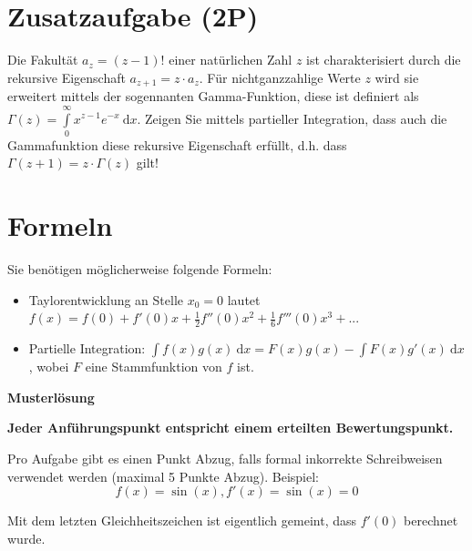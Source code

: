 \documentclass[11pt]{article}
\providecommand\d{}
\renewcommand{\d}[1]{\:\mathrm{d}{#1}}
\begin{document}
\section*{Zusatzaufgabe (2P)}

Die Fakultät $a_z = (z-1)!$ einer natürlichen Zahl  $z$ ist charakterisiert durch die rekursive Eigenschaft $a_{z+1} = z\cdot a_z$. Für nichtganzzahlige Werte $z$ wird sie erweitert mittels der sogennanten Gamma-Funktion, diese ist definiert als $\Gamma(z) = \int\limits_0^\infty x^{z-1} e^{-x} \d x$. Zeigen Sie mittels partieller Integration, dass auch die Gammafunktion diese rekursive Eigenschaft erfüllt, d.h. dass $\Gamma(z+1) = z \cdot \Gamma(z)$ gilt!

\section*{Formeln}

Sie benötigen möglicherweise folgende Formeln:
\begin{itemize}
  \item Taylorentwicklung an Stelle $x_0=0$ lautet $f(x) = f(0) + f'(0)x + \frac{1}{2}f''(0)x^2+\frac{1}{6}f'''(0)x^3+...$
  \item Partielle Integration: $\int f(x)g(x)\d x = F(x)g(x)-\int F(x)g'(x)\d x$, wobei $F$ eine Stammfunktion von $f$ ist.
\end{itemize}

\newpage

\begin{center}
{\bf {\large Musterlösung}}
\end{center}

\begin{center}
\textbf{Jeder Anführungspunkt entspricht einem erteilten Bewertungspunkt.}
\end{center}

Pro Aufgabe gibt es einen Punkt Abzug, falls formal inkorrekte Schreibweisen verwendet werden (maximal 5 Punkte Abzug). Beispiel: 
$$f(x)=\sin(x), f'(x)=\sin(x)=0$$

Mit dem letzten Gleichheitszeichen ist eigentlich gemeint, dass $f'(0)$  berechnet wurde.
\end{document}
